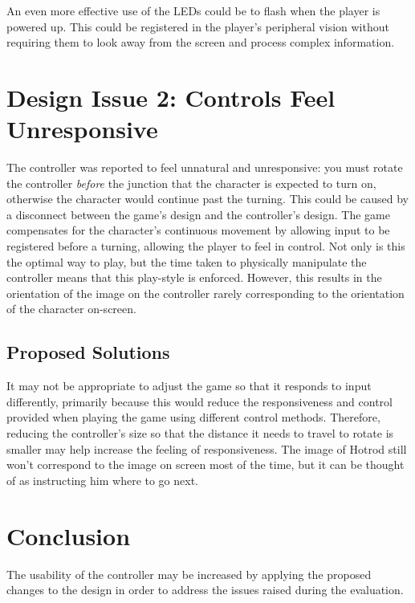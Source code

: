 \documentclass{scrartcl}
\begin{document}
An even more effective use of the LEDs could be to flash when the player is powered up. This could be registered in the player's peripheral vision without requiring them to look away from the screen and process complex information.

\section{Design Issue 2: Controls Feel Unresponsive}
The controller was reported to feel unnatural and unresponsive: you must rotate the controller \textit{before} the junction that the character is expected to turn on, otherwise the character would continue past the turning. This could be caused by a disconnect between the game's design and the controller's design. The game compensates for the character's continuous movement by allowing input to be registered before a turning, allowing the player to feel in control. Not only is this the optimal way to play, but the time taken to physically manipulate the controller means that this play-style is enforced. However, this results in the orientation of the image on the controller rarely corresponding to the orientation of the character on-screen. 

\subsection{Proposed Solutions}
It may not be appropriate to adjust the game so that it responds to input differently, primarily because this would reduce the responsiveness and control provided when playing the game using different control methods. Therefore, reducing the controller's size so that the distance it needs to travel to rotate is smaller may help increase the feeling of responsiveness. The image of Hotrod still won't correspond to the image on screen most of the time, but it can be thought of as instructing him where to go next.

\section{Conclusion}
The usability of the controller may be increased by applying the proposed changes to the design in order to address the issues raised during the evaluation.



\end{document}
